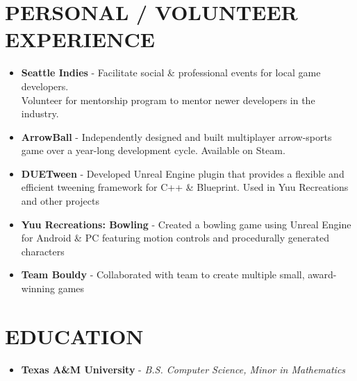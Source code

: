 \documentclass[resmargin,10pt]{res} %
\begin{document}
\begin{resume}
    \section{PERSONAL / VOLUNTEER EXPERIENCE}
    \begin{itemize}
        \setlength\itemsep{-0.0em}
        \item \textbf{Seattle Indies} - Facilitate social \& professional events for local game developers. \\Volunteer for mentorship program to mentor newer developers in the industry.
        \item \textbf{ArrowBall} - Independently designed and built multiplayer arrow-sports game over a year-long development cycle. Available on Steam.
        \item \textbf{DUETween} - Developed Unreal Engine plugin that provides a flexible and efficient tweening framework for C++ \& Blueprint. Used in Yuu Recreations and other projects
        \item \textbf{Yuu Recreations: Bowling} - Created a bowling game using Unreal Engine for Android \& PC featuring motion controls and procedurally generated characters
        \item \textbf{Team Bouldy} - Collaborated with team to create multiple small, award-winning games
    \end{itemize}

    \section{EDUCATION}
    \begin{itemize}
        \setlength\itemsep{0.1em}
        \item[] {\bf Texas A\&M University} - \textit{B.S. Computer Science, Minor in Mathematics}
    \end{itemize}
\end{resume}
\end{document}
